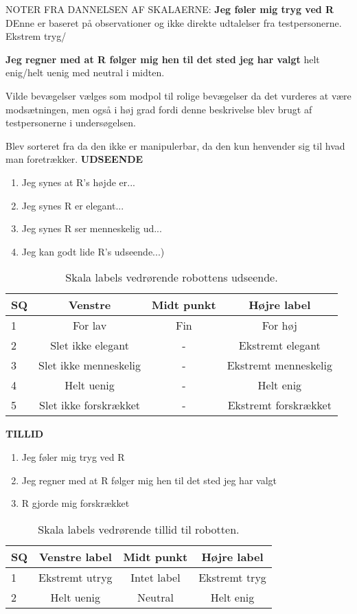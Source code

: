 NOTER FRA DANNELSEN AF SKALAERNE:
\textbf{Jeg føler mig tryg ved R}
DEnne er baseret på observationer og ikke direkte udtalelser fra testpersonerne. 
Ekstrem tryg/

\textbf{Jeg regner med at R følger mig hen til det sted jeg har valgt} 
helt enig/helt uenig med neutral i midten. 

Vilde bevægelser vælges som modpol til rolige bevægelser da det vurderes at være modsætningen, men også i høj grad fordi denne beskrivelse blev brugt af testpersonerne i undersøgelsen. 

Blev sorteret fra da den ikke er manipulerbar, da den kun henvender sig til hvad man foretrækker. \blankline
%
\textbf{UDSEENDE}
%
\begin{enumerate}
  \item Jeg synes at R's højde er...
  \item Jeg synes R er elegant...
  \item Jeg synes R ser menneskelig ud...
  \item Jeg kan godt lide R's udseende...)\blankline
\end{enumerate}
%
\begin{table}[H]
	\centering
	\begin{tabular}{l|c|c|c}
		SQ     & Venstre & Midt punkt & Højre label \\\hline
		1   & For lav  & Fin & For høj        \\\hline
		2   & Slet ikke elegant & - & Ekstremt elegant         \\\hline
		3   & Slet ikke menneskelig & - & Ekstremt menneskelig         \\\hline
	 	4   & Helt uenig & - & Helt enig         \\\hline
		5   & Slet ikke forskrækket & -  & Ekstremt forskrækket           
	\end{tabular}  
	\caption{Skala labels vedrørende robottens udseende.}
	\label{tab:UdseendeSkala}       
\end{table}
\noindent
%
\textbf{TILLID}
%
\begin{enumerate}
  \item Jeg føler mig tryg ved R
  \item Jeg regner med at R følger mig hen til det sted jeg har valgt
  \item R gjorde mig forskrækket\blankline
\end{enumerate}
%
\begin{table}[H]
	\centering 
	\begin{tabular}{l|c|c|c}
		SQ  & Venstre label & Midt punkt & Højre label \\\hline
		1   & Ekstremt utryg & Intet label & Ekstremt tryg  \\\hline
		2   & Helt uenig & Neutral & Helt enig 
	\end{tabular} 
	\caption{Skala labels vedrørende tillid til robotten.}
	\label{tab:TillidSkala}       
\end{table}
